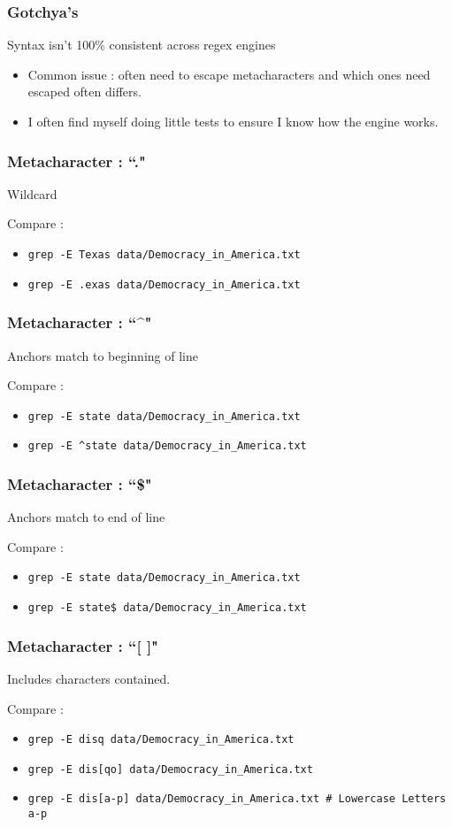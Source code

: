 \documentclass{beamer}
\newcommand{\code}[1]{\colorbox{codegray}{\texttt{#1}}}
\begin{document}
\begin{frame}
\frametitle{Gotchya's}
Syntax isn't 100\% consistent across regex engines
\begin{itemize}
    \item Common issue : often need to escape metacharacters and which ones need escaped often differs.
    \pause
    \item I often find myself doing little tests to ensure I know how the engine works.
\end{itemize}
\end{frame}

\begin{frame}
\frametitle{Metacharacter : ``."}
Wildcard

\bigskip

Compare :
\begin{itemize}
    \item \code{grep -E Texas data/Democracy\_in\_America.txt}
    \pause
    \item \code{grep -E .exas data/Democracy\_in\_America.txt}
\end{itemize}
\end{frame}


\begin{frame}
\frametitle{Metacharacter : ``\^{}"}
Anchors match to beginning of line
\bigskip

Compare :
\begin{itemize}
    \item \code{grep -E state data/Democracy\_in\_America.txt}
    \pause
    \item \code{grep -E \^{}state data/Democracy\_in\_America.txt}
\end{itemize}
\end{frame}

\begin{frame}
\frametitle{Metacharacter : ``\$"}
Anchors match to end of line
\bigskip

Compare :
\begin{itemize}
    \item \code{grep -E state data/Democracy\_in\_America.txt}
    \pause
    \item \code{grep -E state\$ data/Democracy\_in\_America.txt}
\end{itemize}
\end{frame}

\begin{frame}
\frametitle{Metacharacter : ``[ ]"}
Includes characters contained. 
\bigskip

Compare :
\begin{itemize}
    \item \code{grep -E disq data/Democracy\_in\_America.txt}
    \pause
    \item \code{grep -E dis[qo] data/Democracy\_in\_America.txt}
    \pause
    \item \code{grep -E dis[a-p] data/Democracy\_in\_America.txt \# Lowercase Letters a-p}   
\end{itemize}
\end{frame}
\end{document}
